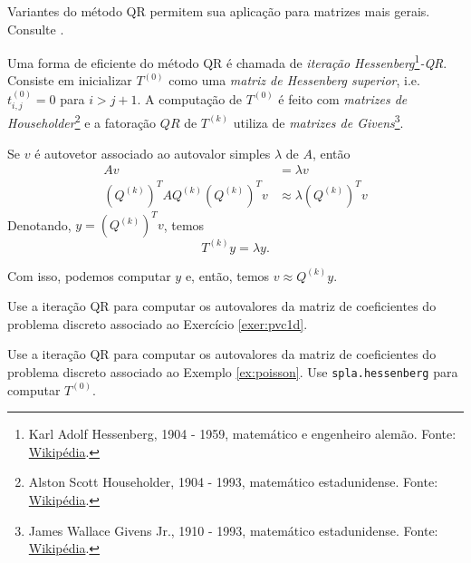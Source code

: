 \begin{obs}
  Variantes do método QR permitem sua aplicação para matrizes mais gerais. Consulte \cite{Golub2013a}.
\end{obs}

Uma forma de eficiente do método QR é chamada de \emph{iteração Hessenberg}\footnote{Karl Adolf Hessenberg, 1904 - 1959, matemático e engenheiro alemão. Fonte: \href{https://pt.wikipedia.org/wiki/Karl_Hessenberg}{Wikipédia}.}\emph{-QR}. Consiste em inicializar $T^{(0)}$ como uma \emph{matriz de Hessenberg superior}, i.e. $t^{(0)}_{i,j}=0$ para $i>j+1$. A computação de $T^{(0)}$ é feito com \emph{matrizes de Householder}\footnote{Alston Scott Householder, 1904 - 1993, matemático estadunidense. Fonte: \href{https://pt.wikipedia.org/wiki/Alston_Scott_Householder}{Wikipédia}.} e a fatoração $QR$ de $T^{(k)}$ utiliza de \emph{matrizes de Givens}\footnote{James Wallace Givens Jr., 1910 - 1993, matemático estadunidense. Fonte: \href{https://pt.wikipedia.org/wiki/Wallace_Givens}{Wikipédia}.}.



\begin{obs}
  Se $v$ é autovetor associado ao autovalor simples $\lambda$ de $A$, então
  \begin{align}
    Av &= \lambda v\\
    (Q^{(k)})^TAQ^{(k)}(Q^{(k)})^Tv &\approx \lambda (Q^{(k)})^Tv
  \end{align}
  Denotando, $y = (Q^{(k)})^Tv$, temos
  \begin{equation}
    T^{(k)}y = \lambda y.
  \end{equation}

  Com isso, podemos computar $y$ e, então, temos $v\approx Q^{(k)}y$.
\end{obs}


\begin{exer}
  Use a iteração QR para computar os autovalores da matriz de coeficientes do problema discreto associado ao Exercício \ref{exer:pvc1d}.
\end{exer}

\begin{exer}
  Use a iteração QR para computar os autovalores da matriz de coeficientes do problema discreto associado ao Exemplo \ref{ex:poisson}. Use \lstinline+spla.hessenberg+ para computar $T^{(0)}$.
\end{exer}
